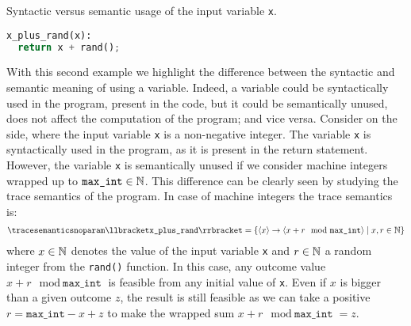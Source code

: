 \begin{example}
  \begin{marginlisting}
    \caption{Syntactic versus semantic usage of the input variable \texttt{x}.}
    \vspace{2\lineheight}
  \begin{lstlisting}[language=Python]
x_plus_rand(x):
  return x + rand();
\end{lstlisting}
  \end{marginlisting}
With this second example we highlight the difference between the syntactic and semantic meaning of using a variable. Indeed, a variable could be syntactically used in the program, \ie present in the code, but it could be semantically unused, \ie does not affect the computation of the program; and vice versa.
Consider  on the side, where the input variable \texttt{x} is a non-negative integer.
The variable \texttt{x} is syntactically used in the program, as it is present in the return statement.
However, the variable \texttt{x} is semantically unused if we consider machine integers wrapped up to $\texttt{max\_int}\in\mathbb{N}$.
This difference can be clearly seen by studying the trace semantics of the program. In case of machine integers the trace semantics is:
\begin{align*}
  \tracesemanticsnoparam\semanticsof{\texttt{x\_plus\_rand}}
  =
  \setdef{
    \langle{x}\rangle\rightarrow\langle{x+r \mod \texttt{max\_int}}\rangle
  }{x, r \in \N}
\end{align*}
where $x\in\mathbb{N}$ denotes the value of the input variable \texttt{x} and $r\in\mathbb{N}$ a random integer from the \texttt{rand()} function.
In this case, any outcome value $x+r \mod \texttt{max\_int}$ is feasible from any initial value of \texttt{x}.
Even if $x$ is bigger than a given outcome $z$, the result is still feasible as we can take a positive $r = \texttt{max\_int} - x + z$ to make the wrapped sum $x + r \mod \texttt{max\_int} = z$.


\end{example}
